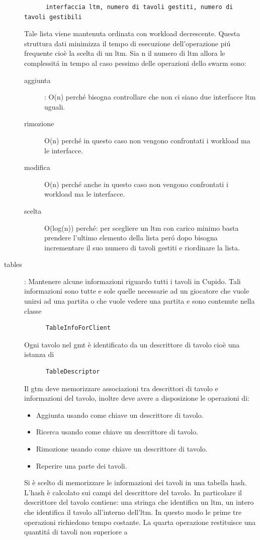 \begin{description}
\begin{verbatim}
	  interfaccia ltm, numero di tavoli gestiti, numero di tavoli gestibili
	\end{verbatim}
	Tale lista viene mantenuta ordinata con workload decrescente. Questa struttura dati minimizza il tempo di esecuzione dell'operazione pi\'u frequente cio\`e la scelta di un ltm.  Sia n il numero di ltm allora le complessit\'a in tempo al caso pessimo delle operazioni dello swarm sono:
	\begin{description}
	  \item[aggiunta]: 
	    O(n) perch\'e bisogna controllare che non ci siano due interfacce ltm uguali.
	  \item[rimozione]
	    O(n) perch\'e in questo caso non vengono confrontati i workload ma le interfacce.
	  \item[modifica]
	    O(n) perch\'e anche in questo caso non vengono confrontati i workload ma le interfacce.
	  \item[scelta]
	    O(log(n)) perch\'e: per scegliere un ltm con carico minimo basta prendere l'ultimo elemento della lista per\'o dopo bisogna incrementare il suo numero di tavoli gestiti e riordinare la lista.
	\end{description}
      \item[tables]:
	Mantenere alcune informazioni riguardo tutti i tavoli in Cupido. Tali informazioni sono tutte e sole quelle necessarie ad un giocatore che vuole unirsi ad una partita o che vuole vedere una partita e sono contenute nella classe 
	\begin{verbatim}
	  TableInfoForClient
	\end{verbatim}
	Ogni tavolo nel gmt \`e identificato da un descrittore di tavolo cio\`e una istanza di
	\begin{verbatim}
	  TableDescriptor
	\end{verbatim}
	Il gtm deve memorizzare associazioni tra descrittori di tavolo e informazioni del tavolo, inoltre deve avere a disposizione le operazioni di:
	\begin{itemize}
	  \item 
	    Aggiunta usando come chiave un descrittore di tavolo.
	  \item
	    Ricerca usando come chiave un descrittore di tavolo.
	  \item
	    Rimozione usando come chiave un descrittore di tavolo.
	  \item
	    Reperire una parte dei tavoli.
	\end{itemize}
	Si \`e scelto di memorizzare le informazioni dei tavoli in una tabella hash. L'hash \`e calcolato sui campi del descrittore del tavolo. In particolare il descrittore del tavolo contiene: una stringa che identifica un ltm, un intero che identifica il tavolo all'interno dell'ltm. In questo modo le prime tre operazioni richiedono tempo costante. La quarta operazione restituisce una quantit\'a di tavoli non superiore a

\end{description}
